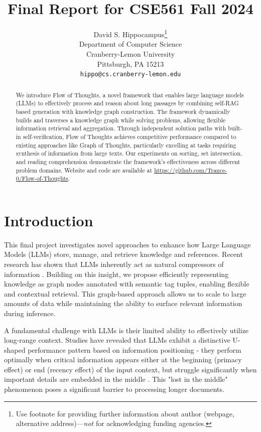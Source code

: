 \documentclass{article}
\title{Final Report for CSE561 Fall 2024}
\author{%
  David S. Hippocampus\thanks{Use footnote for providing further information
    about author (webpage, alternative address)---\emph{not} for acknowledging
    funding agencies.} \\
  Department of Computer Science\\
  Cranberry-Lemon University\\
  Pittsburgh, PA 15213 \\
  \texttt{hippo@cs.cranberry-lemon.edu} \\
}
\begin{document}
\maketitle


\begin{abstract}

    We introduce Flow of Thoughts, a novel framework that enables large language models (LLMs) to effectively process and reason about long passages by combining self-RAG based generation with knowledge graph construction. The framework dynamically builds and traverses a knowledge graph while solving problems, allowing flexible information retrieval and aggregation. Through independent solution paths with built-in self-verification, Flow of Thoughts achieves competitive performance compared to existing approaches like Graph of Thoughts, particularly excelling at tasks requiring synthesis of information from large texts. Our experiments on sorting, set intersection, and reading comprehension demonstrate the framework's effectiveness across different problem domains. Website and code are available at \url{https://github.com/Trance-0/Flow-of-Thoughts}.

\end{abstract}


\section{Introduction}

This final project investigates novel approaches to enhance how Large Language Models (LLMs) store, manage, and retrieve knowledge and references. Recent research has shown that LLMs inherently act as natural compressors of information \cite{delétang2024languagemodelingcompression}. Building on this insight, we propose efficiently representing knowledge as graph nodes annotated with semantic tag tuples, enabling flexible and contextual retrieval. This graph-based approach allows us to scale to large amounts of data while maintaining the ability to surface relevant information during inference.

A fundamental challenge with LLMs is their limited ability to effectively utilize long-range context. Studies have revealed that LLMs exhibit a distinctive U-shaped performance pattern based on information positioning - they perform optimally when critical information appears either at the beginning (primacy effect) or end (recency effect) of the input context, but struggle significantly when important details are embedded in the middle \cite{liu2023lostmiddlelanguagemodels}. This "lost in the middle" phenomenon poses a significant barrier to processing longer documents.
\end{document}
